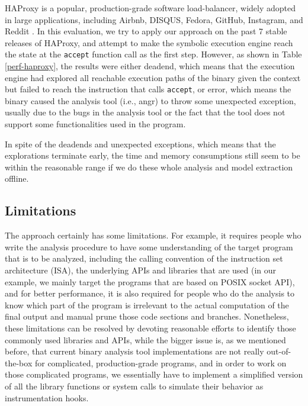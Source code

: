 HAProxy is a popular, production-grade software load-balancer, widely adopted in
large applications, including Airbnb, DISQUS, Fedora, GitHub, Instagram, and
Reddit \cite{haproxy-they-use-it}. In this evaluation, we try to apply our
approach on the past 7 stable releases of HAProxy, and attempt to make the
symbolic execution engine reach the state at the \texttt{accept} function call
as the first step. However, as shown in Table \ref{perf-haproxy}, the results
were either deadend, which means that the execution engine had explored all
reachable execution paths of the binary given the context but failed to reach
the instruction that calls \texttt{accept}, or error, which means the binary
caused the analysis tool (i.e., angr) to throw some unexpected exception,
usually due to the bugs in the analysis tool or the fact that the tool does not
support some functionalities used in the program.

In spite of the deadends and unexpected exceptions, which means that the
explorations terminate early, the time and memory consumptions still seem to be
within the reasonable range if we do these whole analysis and model extraction
offline.


\subsection{Limitations}

The approach certainly has some limitations. For example, it requires people who
write the analysis procedure to have some understanding of the target program
that is to be analyzed, including the calling convention of the instruction set
architecture (ISA), the underlying APIs and libraries that are used (in our
example, we mainly target the programs that are based on POSIX socket API), and
for better performance, it is also required for people who do the analysis to
know which part of the program is irrelevant to the actual computation of the
final output and manual prune those code sections and branches. Nonetheless,
these limitations can be resolved by devoting reasonable efforts to identify
those commonly used libraries and APIs, while the bigger issue is, as we
mentioned before, that current binary analysis tool implementations are not
really out-of-the-box for complicated, production-grade programs, and in order
to work on those complicated programs, we essentially have to implement a
simplified version of all the library functions or system calls to simulate
their behavior as instrumentation hooks.


